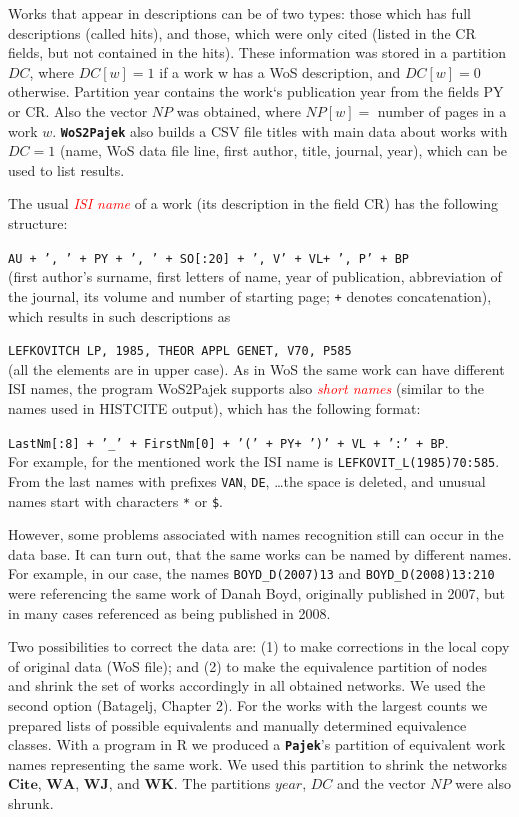 \documentclass[11pt]{article} %
\newcommand{\Pajek}{\texttt{\textbf{Pajek}}\xspace}
\newcommand{\WoSPajek}{\texttt{\textbf{WoS2Pajek}}\xspace}
\newcommand{\keyw}[1]{\textcolor{red}{\emph{#1}}}
\newcommand{\WA}{\mathbf{W\!\!A}}
\newcommand{\WK}{\mathbf{W\!K}}
\newcommand{\WJ}{\mathbf{W\!J}}
\newcommand{\Ci}{\mathbf{Cite}}
\newcommand{\NP}{N\!P}
\newcommand{\Remark}[1]{\ifodd\value{page} \normalmarginpar
 \else \reversemarginpar \fi \marginpar{{\footnotesize #1}} }
\begin{document}
Works that appear in descriptions can be of two types: those which has full descriptions (called hits), and those, which were only cited (listed in the CR fields, but not contained in the hits). These information was stored in a partition $DC$, where $DC[w] = 1$ if a work w has a WoS description, and $DC[w] = 0$ otherwise. Partition year contains the work`s publication year from the fields PY or CR. Also the vector $\NP$ was obtained, where $\NP[w] =$ number of pages in a work $w$. \WoSPajek also builds a CSV file titles with main data about works with $DC = 1$ (name, WoS data file line, first author, title, journal, year), which can be used to list results. \medskip 

The usual \keyw{ISI name} of a work (its description in the field CR) has the following structure: \smallskip
 
 \texttt {AU {+ ', ' +} PY \texttt{+ ', ' +} SO[:20] \texttt{+ ', V' +} VL\texttt{+ ', P' +} BP}  \smallskip\\
(first author's surname, first letters of name, year of publication, abbreviation of the journal, its volume and number of starting page; \texttt{+} denotes concatenation), which results in such descriptions as \Remark{other example ?}\smallskip

\texttt{LEFKOVITCH LP, 1985, THEOR APPL GENET, V70, P585}\smallskip\\  (all the elements are in upper case). As in WoS the same work can have different ISI names, the  program WoS2Pajek supports also \keyw{short names} (similar to the names used in HISTCITE output), which has the following format:\smallskip

 \texttt {LastNm[:8] \texttt{+ '\_' +} FirstNm[0] \texttt{+ '(' +} PY\texttt{+ ')' +} VL \texttt{+ ':' +} BP}. \smallskip\\ For example, for the mentioned work the ISI name is \texttt{LEFKOVIT\_L(1985)70:585}. From the last names with prefixes \texttt{VAN}, \texttt{DE}, \ldots the space is deleted, and unusual names start with characters \texttt{*} or \texttt{\$}.\medskip 

However, some problems associated with names recognition still can occur in the data base. It can turn out, that the same works can be named by different names. For example, in our case, the names \texttt {BOYD\_D(2007)13} and \texttt {BOYD\_D(2008)13:210} were referencing the same work of Danah Boyd, originally published in 2007, but in many cases referenced as being published in 2008. \medskip 

Two possibilities to correct the data are: (1) to make corrections in the local copy of original data (WoS file); and (2) to make the equivalence partition of nodes and shrink the set of works accordingly in all  obtained networks. We used the second option (Batagelj, Chapter 2). For the works with the largest counts we prepared lists of possible equivalents and manually determined equivalence classes. With a program in R we produced a \Pajek's partition of equivalent work names representing the same work. We used this partition to shrink the networks $\Ci$, $\WA$, $\WJ$, and $\WK$. The partitions $year$,  $DC$ and the vector $\NP$ were also shrunk.  \medskip 
\end{document}
